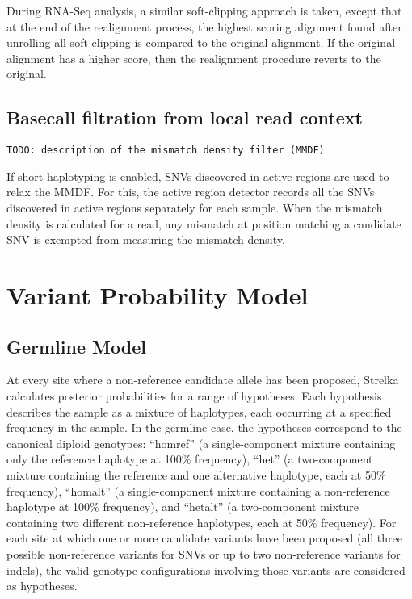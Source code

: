 \documentclass{article}
\begin{document}
During RNA-Seq analysis, a similar soft-clipping approach is taken, except that at the end of the realignment process, the highest scoring alignment found after unrolling all soft-clipping is compared to the original alignment. If the original alignment has a higher score, then the realignment procedure reverts to the original.

\subsection{Basecall filtration from local read context}
\label{sec:BasecallFiltrationFromContext}

{\tt TODO: description of the mismatch density filter (MMDF)}

If short haplotyping is enabled, SNVs discovered in active regions are used to relax the MMDF. For this, the active region detector records all the SNVs discovered in active regions separately for each sample. When the mismatch density is calculated for a read, any mismatch at position matching a candidate SNV is exempted from measuring the mismatch density.


\section{Variant Probability Model}
\subsection{Germline Model}
\label{sec:germline}
At every site where a non-reference candidate allele has been proposed, Strelka calculates posterior probabilities for a range of hypotheses. Each hypothesis describes the sample as a mixture of haplotypes, each occurring at a specified frequency in the sample. In the germline case, the hypotheses correspond to the canonical diploid genotypes: ``homref'' (a single-component mixture containing only the reference haplotype at 100\% frequency), ``het'' (a two-component mixture containing the reference and one alternative haplotype, each at 50\% frequency), ``homalt'' (a single-component mixture containing a non-reference haplotype at 100\% frequency), and ``hetalt'' (a two-component mixture containing two different non-reference haplotypes, each at 50\% frequency). For each site at which one or more candidate variants have been proposed (all three possible non-reference variants for SNVs or up to two non-reference variants for indels), the valid genotype configurations involving those variants are considered as hypotheses. 
\end{document}
